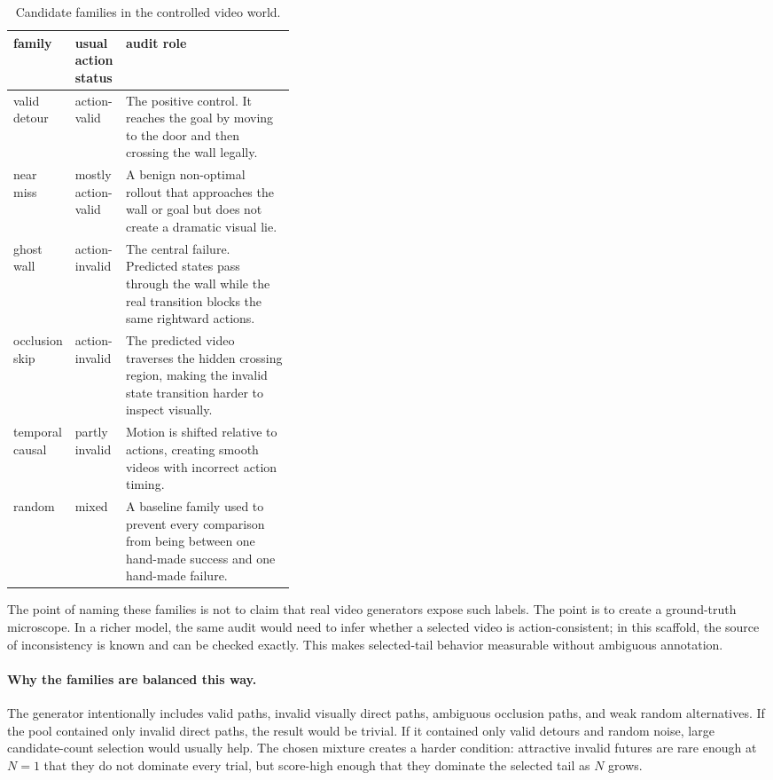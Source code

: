 \documentclass{article}
\begin{document}
\begin{table}[tbp]
  \centering
  \small
  \caption{Candidate families in the controlled video world.}
  \label{tab:candidate-families}
  \begin{tabularx}{\linewidth}{@{}p{0.19\linewidth}p{0.18\linewidth}X@{}}
    \toprule
    family & usual action status & audit role \\
    \midrule
    valid detour & action-valid & The positive control. It reaches the goal by moving to the door and then crossing the wall legally. \\
    near miss & mostly action-valid & A benign non-optimal rollout that approaches the wall or goal but does not create a dramatic visual lie. \\
    ghost wall & action-invalid & The central failure. Predicted states pass through the wall while the real transition blocks the same rightward actions. \\
    occlusion skip & action-invalid & The predicted video traverses the hidden crossing region, making the invalid state transition harder to inspect visually. \\
    temporal causal & partly invalid & Motion is shifted relative to actions, creating smooth videos with incorrect action timing. \\
    random & mixed & A baseline family used to prevent every comparison from being between one hand-made success and one hand-made failure. \\
    \bottomrule
  \end{tabularx}
\end{table}

The point of naming these families is not to claim that real video generators expose such labels. The point is to create a ground-truth microscope. In a richer model, the same audit would need to infer whether a selected video is action-consistent; in this scaffold, the source of inconsistency is known and can be checked exactly. This makes selected-tail behavior measurable without ambiguous annotation.

\paragraph{Why the families are balanced this way.}
The generator intentionally includes valid paths, invalid visually direct paths, ambiguous occlusion paths, and weak random alternatives. If the pool contained only invalid direct paths, the result would be trivial. If it contained only valid detours and random noise, large candidate-count selection would usually help. The chosen mixture creates a harder condition: attractive invalid futures are rare enough at \(N=1\) that they do not dominate every trial, but score-high enough that they dominate the selected tail as \(N\) grows.
\end{document}
